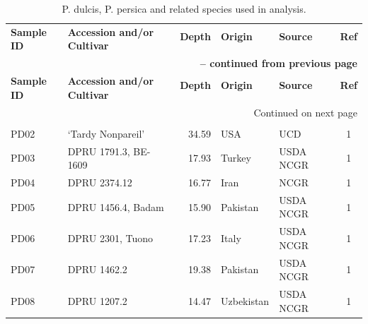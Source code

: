 \documentclass[12pt]{article}
\begin{document}
\begin{center}
\begin{longtable}{llrllc}
\caption{P. dulcis, P. persica and related species used in analysis.} \label{sampledetails} \\
\hline \hline
\multicolumn{1}{l}{\multirow{2}{1.5cm}{\textbf{Sample ID}}} &
\multicolumn{1}{l}{\multirow{2}{3.5cm}{\textbf{Accession and/or Cultivar}}} &
\multicolumn{1}{c}{\textbf{Depth}} &
\multicolumn{1}{l}{\textbf{Origin}} &
\multicolumn{1}{l}{\textbf{Source}} &
\multicolumn{1}{c}{\textbf{Ref}}\\ \\
\hline 
\endfirsthead

\multicolumn{6}{r}{{\bfseries \tablename\ \thetable{} -- continued from previous page}} \\
\hline 
\multicolumn{1}{l}{\multirow{2}{1.5cm}{\textbf{Sample ID}}} &
\multicolumn{1}{l}{\multirow{2}{3.5cm}{\textbf{Accession and/or Cultivar}}} &
\multicolumn{1}{c}{\textbf{Depth}} &
\multicolumn{1}{l}{\textbf{Origin}} &
\multicolumn{1}{l}{\textbf{Source}} &
\multicolumn{1}{c}{\textbf{Ref}} \\ \\ \hline 
\endhead
%
\hline \multicolumn{6}{r}{{Continued on next page}} \\ \hline \hline
\endfoot
%
\endlastfoot
%
	\multicolumn{6}{l}{\emph{P. dulcis}}  \\
	PD02 &‘Tardy Nonpareil’ &34.59 &USA &UCD &1\\
	PD03 &DPRU 1791.3, BE-1609 &17.93 &Turkey &USDA NCGR &1\\
	PD04 &DPRU 2374.12 &16.77 &Iran &NCGR &1\\
	PD05 &DPRU 1456.4, Badam &15.90 &Pakistan &USDA NCGR &1\\
	PD06 &DPRU 2301, Tuono &17.23 &Italy &USDA NCGR &1\\
	PD07 &DPRU 1462.2 &19.38 &Pakistan &USDA NCGR &1\\
	PD08 &DPRU 1207.2 &14.47 &Uzbekistan &USDA NCGR &1\\

\end{longtable}
\end{center}
\end{document}
